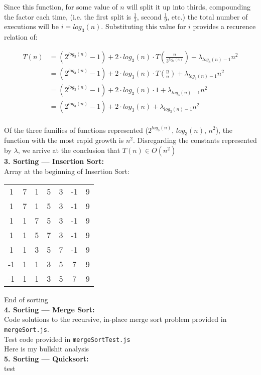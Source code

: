 \documentclass[12pt]{article}
\begin{document}
Since this function, for some value of $n$ will split it up into thirds, compounding the factor each time, (i.e. the first split is $\frac{1}{3}$, second $\frac{1}{9}$, etc.) the total number of executions will be $i = log_3(n)$. Substituting this value for $i$ provides a recurence relation of:

\begin{align*}
    T(n) &= (2^{log_3(n)} - 1) + 2 \cdot log_3(n) \cdot T(\frac{n}{3^{log_3(n)}}) + \lambda_{log_3(n)-1}n^2 \\
    &= (2^{log_3(n)} - 1) + 2 \cdot log_3(n) \cdot T(\frac{n}{n}) + \lambda_{log_3(n)-1}n^2 \\
    &= (2^{log_3(n)} - 1) + 2 \cdot log_3(n) \cdot 1 + \lambda_{log_3(n)-1}n^2 \\
    &= (2^{log_3(n)} - 1) + 2 \cdot log_3(n) + \lambda_{log_3(n)-1}n^2
\end{align*} \\

Of the three families of functions represented ($2^{log_3(n)}$, $log_3(n)$, $n^2$), the function with the most rapid growth is $n^2$. Disregarding the constants represented by $\lambda$, we arrive at the conclusion that $T(n) \in O(n^2)$ \\

\textbf{3. Sorting --- Insertion Sort:}\\
Array at the beginning of Insertion Sort:
\begin{center}
\begin{tabular}{ccccccc}
1 &7 &1 &5 &3 &-1 &9 \\
1 & 7 & 1 & 5 & 3 & -1 & 9 \\
1 & 1 & 7 & 5 & 3 & -1 & 9 \\
1 & 1 & 5 & 7 & 3 & -1 & 9 \\
1 & 1 & 3 & 5 & 7 & -1 & 9 \\
-1 & 1 & 1 & 3 & 5 & 7 & 9 \\
-1 & 1 & 1 & 3 & 5 & 7 & 9
\end{tabular}{}
\end{center}
End of sorting \\

\textbf{4. Sorting --- Merge Sort:} \\

Code solutions to the recursive, in-place merge sort problem provided in \texttt{mergeSort.js}. \\

Test code provided in \texttt{mergeSortTest.js} \\

Here is my bullshit analysis \\

\textbf{5. Sorting --- Quicksort:} \\
test
\end{document}
